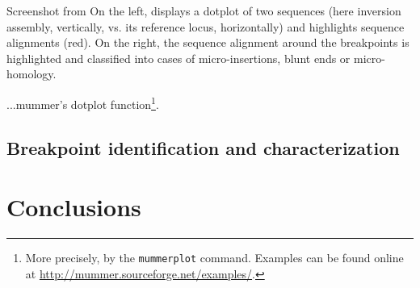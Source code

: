     {Screenshot from \maze}
    {On the left, \maze displays a dotplot of two sequences (here inversion
    assembly, vertically, vs. its reference locus, horizontally) and highlights
    sequence alignments (red). On the right, the sequence alignment around the
    breakpoints is highlighted and classified into cases of micro-insertions,
    blunt ends or micro-homology.}



...\acs{mummer}'s dotplot function\footnote{More precisely, by the \texttt{mummerplot} command.
Examples can be found online at \url{http://mummer.sourceforge.net/examples/}.}.



\subsection{Breakpoint identification and characterization}



\section{Conclusions}
